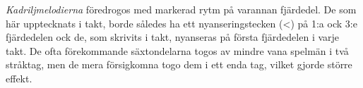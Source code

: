\thispagestyle{empty}
\vspace*{8cm}
\begin{adjustwidth*}{30mm}{30mm}
\setlength{\parindent}{0em}

\textit{Kadriljmelodierna} föredrogos med markerad rytm på
varannan fjärdedel. De som här upptecknats i  takt, borde
således ha ett nyanseringstecken (<) på 1:a ock 3:e fjärdedelen
ock de, som skrivits i  takt, nyanseras på första
fjärdedelen i varje takt. De ofta förekommande säxtondelarna
togos av mindre vana spelmän i två \guillemotright{}stråktag\guillemotright{}, men de mera
försigkomna togo dem i ett enda \guillemotright{}tag\guillemotright{}, vilket gjorde större
\guillemotright{}effekt\guillemotright{}.

\end{adjustwidth*}

